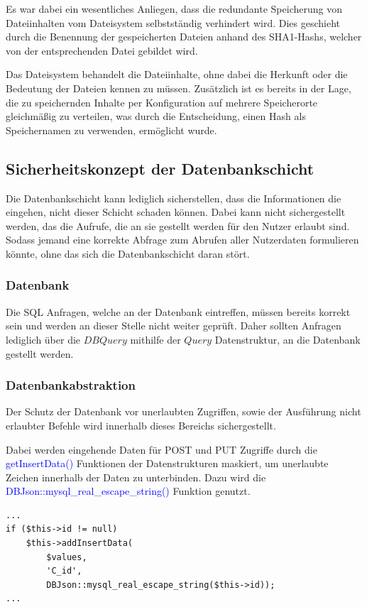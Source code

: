 \documentclass[10pt,a4paper,final,parskip]{scrartcl}
\newcommand{\blau}[1]{\textcolor{blue}{#1}}
\begin{document}
\parbox{\textwidth}{Es war dabei ein wesentliches Anliegen, dass die redundante Speicherung von Dateiinhalten vom Dateisystem selbstständig verhindert wird. Dies geschieht durch die Benennung der gespeicherten Dateien anhand des SHA1-Hashs, welcher von der entsprechenden Datei gebildet wird.}

\parbox{\textwidth}{Das Dateisystem behandelt die Dateiinhalte, ohne dabei die Herkunft oder die Bedeutung der Dateien kennen zu müssen. Zusätzlich ist es bereits in der Lage, die zu speichernden Inhalte per Konfiguration auf mehrere Speicherorte gleichmäßig zu verteilen, was durch die Entscheidung, einen Hash als Speichernamen zu verwenden, ermöglicht wurde.}


\subsection{Sicherheitskonzept der Datenbankschicht}
Die Datenbankschicht kann lediglich sicherstellen, dass die Informationen die eingehen, nicht dieser Schicht schaden können. Dabei kann nicht sichergestellt werden, das die Aufrufe, die an sie gestellt werden für den Nutzer erlaubt sind. Sodass jemand eine korrekte Abfrage zum Abrufen aller Nutzerdaten formulieren könnte, ohne das sich die Datenbankschicht daran stört.

\subsubsection{Datenbank}
Die SQL Anfragen, welche an der Datenbank eintreffen, müssen bereits korrekt sein und werden an dieser Stelle nicht weiter geprüft. Daher sollten Anfragen lediglich über die $DBQuery$ mithilfe der $Query$ Datenstruktur, an die Datenbank gestellt werden.

\subsubsection{Datenbankabstraktion}
Der Schutz der Datenbank vor unerlaubten Zugriffen, sowie der Ausführung nicht erlaubter Befehle wird innerhalb dieses Bereichs sichergestellt.

Dabei werden eingehende Daten für POST und PUT Zugriffe durch die \blau{getInsertData()} Funktionen der Datenstrukturen maskiert, um unerlaubte Zeichen innerhalb der Daten zu unterbinden. Dazu wird die \blau{DBJson::mysql\_real\_escape\_string()} Funktion genutzt.

\begin{minipage}{\textwidth}
\begin{lstlisting}
...
if ($this->id != null) 
    $this->addInsertData(
        $values, 
        'C_id',
        DBJson::mysql_real_escape_string($this->id));
...
\end{lstlisting}
\end{minipage}
\end{document}
